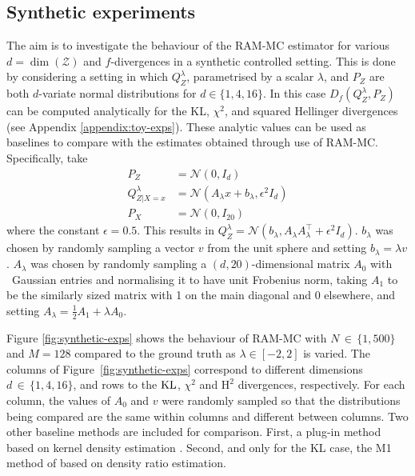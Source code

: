 \subsection{Synthetic experiments}\label{section:synth-exps}
The aim is to investigate the behaviour of the RAM-MC estimator for various $d=\dim(\mathcal{Z})$ and $f$-divergences in a synthetic controlled setting. 
This is done by considering a setting in which $Q^{\lambda}_Z$, parametrised by a scalar $\lambda$, and $P_Z$ are both $d$-variate normal distributions for $d\in\{1, 4, 16\}$.
In this case $D_f(Q^\lambda_Z, P_Z)$ can be computed analytically for the KL, $\chi^2$, and squared Hellinger divergences (see Appendix \ref{appendix:toy-exps}).
These analytic values can be used as baselines to compare with the estimates obtained through use of RAM-MC. 
Specifically, take 
\begin{align*}
P_Z &= \mathcal{N}(0, I_d) \\
Q^\lambda_{Z|X=x} &= \mathcal{N}\left(A_\lambda x + b_\lambda, \epsilon^2 I_d \right) \\
P_X &= \mathcal{N}\left(0, I_{20} \right)
\end{align*}
where the constant $\epsilon=0.5$.
This results in $Q^\lambda_Z = \mathcal{N}\left(b_\lambda,  A_\lambda A_\lambda^\intercal + \epsilon^2 I_d \right)$. 
$b_\lambda$ was chosen by randomly sampling a vector $v$ from the unit sphere and setting $b_\lambda = \lambda v$. 
$A_\lambda$ was chosen by randomly sampling a $(d,20)$-dimensional matrix $A_0$ with \iid~Gaussian entries and normalising it to have unit Frobenius norm, taking $A_1$ to be the similarly sized matrix with 1 on the main diagonal and 0 elsewhere, and setting $A_\lambda = \frac{1}{2}A_1 + \lambda A_0$.



%
%

Figure \ref{fig:synthetic-exps} shows the behaviour of RAM-MC with $N\,{\in}\,\{1, 500\}$ and $M{=}128$ compared to the ground truth as $\lambda \in [-2, 2]$ is varied. 
The columns of Figure~\ref{fig:synthetic-exps} correspond to different dimensions $d\,{\in}\,\{1, 4, 16\}$, and rows to the $\mathrm{KL}$, $\chi^2$ and $\mathrm{H}^2$ divergences, respectively. 
For each column, the values of $A_0$ and $v$ were randomly sampled so that the distributions being compared are the same within columns and different between columns.
Two other baseline methods are included for comparison.
First, a plug-in method based on kernel density estimation \citep{moon14ensemble}.
Second, and only for the KL case, the M1 method of \cite{nguyen10ratio} based on density ratio estimation.

